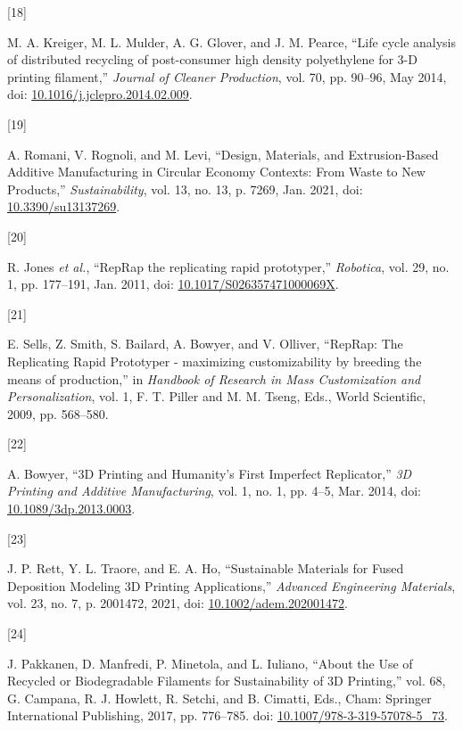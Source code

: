 \documentclass[
]{article}
\newlength{\cslhangindent}
\newlength{\csllabelwidth}
\newlength{\cslentryspacingunit} %
\newenvironment{CSLReferences}[2] %
 {%
  \setlength{\parindent}{0pt}
  \ifodd #1
  \let\oldpar\par
  \def\par{\hangindent=\cslhangindent\oldpar}
  \fi
  \setlength{\parskip}{#2\cslentryspacingunit}
 }%
 {}
\newcommand{\CSLLeftMargin}[1]{\parbox[t]{\csllabelwidth}{#1}}
\newcommand{\CSLRightInline}[1]{\parbox[t]{\linewidth - \csllabelwidth}{#1}\break}
\begin{document}
\begin{CSLReferences}{0}{0}
\leavevmode{}%
\CSLLeftMargin{{[}18{]} }%
\CSLRightInline{M. A. Kreiger, M. L. Mulder, A. G. Glover, and J. M.
Pearce, {``Life cycle analysis of distributed recycling of post-consumer
high density polyethylene for 3-{D} printing filament,''} \emph{Journal
of Cleaner Production}, vol. 70, pp. 90--96, May 2014, doi:
\href{https://doi.org/10.1016/j.jclepro.2014.02.009}{10.1016/j.jclepro.2014.02.009}.}

\leavevmode{}%
\CSLLeftMargin{{[}19{]} }%
\CSLRightInline{A. Romani, V. Rognoli, and M. Levi, {``Design,
{Materials}, and {Extrusion-Based Additive Manufacturing} in {Circular
Economy Contexts}: {From Waste} to {New Products},''}
\emph{Sustainability}, vol. 13, no. 13, p. 7269, Jan. 2021, doi:
\href{https://doi.org/10.3390/su13137269}{10.3390/su13137269}.}

\leavevmode{}%
\CSLLeftMargin{{[}20{]} }%
\CSLRightInline{R. Jones \emph{et al.}, {``{RepRap} \textendash{} the
replicating rapid prototyper,''} \emph{Robotica}, vol. 29, no. 1, pp.
177--191, Jan. 2011, doi:
\href{https://doi.org/10.1017/S026357471000069X}{10.1017/S026357471000069X}.}

\leavevmode{}%
\CSLLeftMargin{{[}21{]} }%
\CSLRightInline{E. Sells, Z. Smith, S. Bailard, A. Bowyer, and V.
Olliver, {``{RepRap}: {The Replicating Rapid Prototyper} - maximizing
customizability by breeding the means of production,''} in
\emph{Handbook of {Research} in {Mass Customization} and
{Personalization}}, vol. 1, F. T. Piller and M. M. Tseng, Eds., {World
Scientific}, 2009, pp. 568--580.}

\leavevmode{}%
\CSLLeftMargin{{[}22{]} }%
\CSLRightInline{A. Bowyer, {``{3D Printing} and {Humanity}'s {First
Imperfect Replicator},''} \emph{3D Printing and Additive Manufacturing},
vol. 1, no. 1, pp. 4--5, Mar. 2014, doi:
\href{https://doi.org/10.1089/3dp.2013.0003}{10.1089/3dp.2013.0003}.}

\leavevmode{}%
\CSLLeftMargin{{[}23{]} }%
\CSLRightInline{J. P. Rett, Y. L. Traore, and E. A. Ho, {``Sustainable
{Materials} for {Fused Deposition Modeling 3D Printing Applications},''}
\emph{Advanced Engineering Materials}, vol. 23, no. 7, p. 2001472, 2021,
doi:
\href{https://doi.org/10.1002/adem.202001472}{10.1002/adem.202001472}.}

\leavevmode{}%
\CSLLeftMargin{{[}24{]} }%
\CSLRightInline{J. Pakkanen, D. Manfredi, P. Minetola, and L. Iuliano,
{``About the {Use} of {Recycled} or {Biodegradable Filaments} for
{Sustainability} of {3D Printing},''} vol. 68, G. Campana, R. J.
Howlett, R. Setchi, and B. Cimatti, Eds., {Cham}: {Springer
International Publishing}, 2017, pp. 776--785. doi:
\href{https://doi.org/10.1007/978-3-319-57078-5_73}{10.1007/978-3-319-57078-5\_73}.}


\end{CSLReferences}
\end{document}
